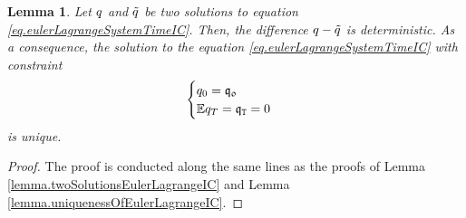 \documentclass[10pt,a4paper]{article}
\newtheorem{lemma}[thm]{Lemma}
\begin{document}
	\begin{lemma}\label{lemma.uniquenessOfSolutionEulerLagrangeTimeIC}
	Let $q$ and $\tilde{q}$ be two solutions to equation \eqref{eq.eulerLagrangeSystemTimeIC}. Then, the difference $q - \tilde{q}$ is deterministic. As a consequence, the solution to the equation \eqref{eq.eulerLagrangeSystemTimeIC} with constraint
	\begin{equation}\label{eq.initialAndTerminalCOnditionsTimeIC}
	\begin{cases}
	q_0 = \mathfrak{q_0} \\
	\mathbb{{E}} q_T = \mathfrak{q}_{\mathtt{T} } = 0 
	\end{cases}
	\end{equation}
	is unique.
	\end{lemma}
	\begin{proof}
		The proof is conducted along the same lines as the proofs of Lemma \ref{lemma.twoSolutionsEulerLagrangeIC} and Lemma \ref{lemma.uniquenessOfEulerLagrangeIC}. 
	\end{proof}
	
\end{document}
